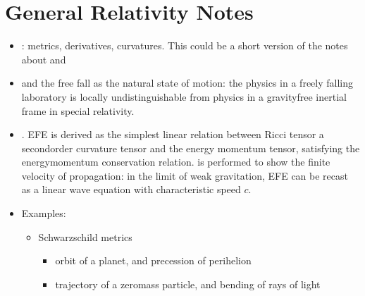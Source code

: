 \documentclass[letterpaper,10pt,english]{jupyterBook}
\begin{document}
\chapter{General Relativity \sphinxhyphen{} Notes}
\label{\detokenize{ch/relativity-general/notes:general-relativity-notes}}\label{\detokenize{ch/relativity-general/notes:relativity-general-notes}}\label{\detokenize{ch/relativity-general/notes::doc}}\begin{itemize}
\item {} 
\sphinxAtStartPar
{\hyperref[\detokenize{ch/relativity-general/differential-geometry:relativity-general-notes-differential-geometry}]{}}: metrics, derivatives, curvatures. This could be a short version of the notes about  and 

\item {} 
\sphinxAtStartPar
{} and the free fall as the natural state of motion: the physics in a freely falling laboratory is locally undistinguishable from physics in a gravity\sphinxhyphen{}free inertial frame in special relativity.

\item {} 
\sphinxAtStartPar
{\hyperref[\detokenize{ch/relativity-general/einstein-equation:relativity-general-notes-einstein-equation}]{}}. EFE is derived as the simplest linear relation between Ricci tensor \sphinxhyphen{} a second\sphinxhyphen{}order curvature tensor \sphinxhyphen{} and the energy momentum tensor, satisfying the energy\sphinxhyphen{}momentum conservation relation. {\hyperref[\detokenize{ch/relativity-general/linearized-efe:relativity-general-notes-einstein-equation-linearization}]{}} is performed to show the finite velocity of propagation: in the limit of weak gravitation, EFE can be recast as a linear wave equation with characteristic speed \(c\).

\item {} 
\sphinxAtStartPar
Examples:
\begin{itemize}
\item {} 
\sphinxAtStartPar
Schwarzschild metrics
\begin{itemize}
\item {} 
\sphinxAtStartPar
orbit of a planet, and precession of perihelion

\item {} 
\sphinxAtStartPar
trajectory of a zero\sphinxhyphen{}mass particle, and bending of rays of light

\end{itemize}

\end{itemize}

\end{itemize}
\end{document}
